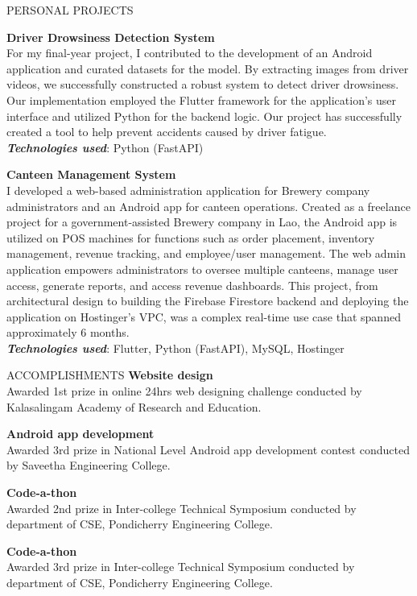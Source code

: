 \documentclass{template}
\begin{document}
\begin{rSection}{PERSONAL PROJECTS}
\begin{itemize}
\end{itemize}

\textbf{Driver Drowsiness Detection System} \\
For my final-year project, I contributed to the development of an Android application and curated datasets for the model. By extracting images from driver videos, we successfully constructed a robust system to detect driver drowsiness. Our implementation employed the Flutter framework for the application's user interface and utilized Python for the backend logic. Our project has successfully created a tool to help prevent accidents caused by driver fatigue. \\
\textbf{\textit{Technologies used}}: Python (FastAPI)

\textbf{Canteen Management System} \\
I developed a web-based administration application for Brewery company administrators and an Android app for canteen operations. Created as a freelance project for a government-assisted Brewery company in Lao, the Android app is utilized on POS machines for functions such as order placement, inventory management, revenue tracking, and employee/user management. The web admin application empowers administrators to oversee multiple canteens, manage user access, generate reports, and access revenue dashboards. This project, from architectural design to building the Firebase Firestore backend and deploying the application on Hostinger's VPC, was a complex real-time use case that spanned approximately 6 months. \\
\textbf{\textit{Technologies used}}: Flutter, Python (FastAPI), MySQL, Hostinger

\end{rSection}

\begin{rSection}{ACCOMPLISHMENTS}
\textbf{Website design} \\
Awarded 1st prize in online 24hrs web designing challenge conducted by Kalasalingam Academy of Research and Education.

\textbf{Android app development} \\
Awarded 3rd prize in National Level Android app development contest conducted by Saveetha Engineering College.

\textbf{Code-a-thon} \\
Awarded 2nd prize in Inter-college Technical Symposium conducted by department of CSE, Pondicherry Engineering College.

\textbf{Code-a-thon} \\
Awarded 3rd prize in Inter-college Technical Symposium conducted by department of CSE, Pondicherry Engineering College.

\end{rSection}
\end{document}
